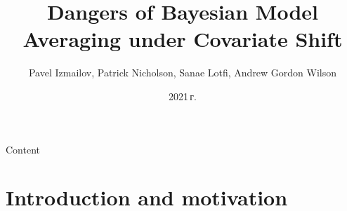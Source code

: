 \documentclass[unicode]{beamer}
\title[]{Dangers of Bayesian Model Averaging under Covariate Shift}
\author{Pavel Izmailov, Patrick Nicholson, Sanae Lotfi, Andrew Gordon Wilson}
\date{
    2021\,г.
}
\numberwithin{equation}{section}
\begin{document}
\begin{frame}
  \titlepage
\end{frame}




\begin{frame}{Content}
    \tableofcontents
\end{frame}
\section{Introduction and motivation}
\end{document}
